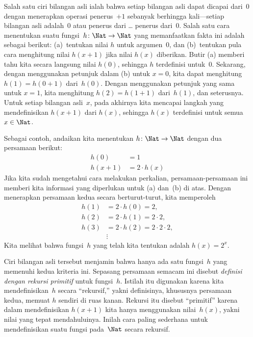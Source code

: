 \documentclass[../../../include/open-logic-section]{subfiles}
\begin{document}

Salah satu ciri bilangan asli ialah bahwa setiap bilangan asli dapat dicapai
dari~$0$ dengan menerapkan operasi penerus~$+1$ sebanyak berhingga kali---setiap
bilangan asli adalah~$0$ atau penerus dari \dots{} penerus dari~$0$. Salah satu
cara menentukan suatu fungsi~$h\colon\Nat \to \Nat$ yang memanfaatkan fakta
ini adalah sebagai berikut: (a)~tentukan nilai $h$ untuk argumen~$0$, dan
(b)~tentukan pula cara menghitung nilai $h(x+1)$ jika nilai $h(x)$ diberikan.
Butir (a) memberi tahu kita secara langsung nilai $h(0)$, sehingga $h$
terdefinisi untuk~$0$. Sekarang, dengan menggunakan petunjuk dalam (b) untuk
$x=0$, kita dapat menghitung $h(1) = h(0+1)$ dari~$h(0)$. Dengan menggunakan
petunjuk yang sama untuk $x=1$, kita menghitung $h(2) = h(1+1)$ dari~$h(1)$,
dan seterusnya. Untuk setiap bilangan asli~$x$, pada akhirnya kita mencapai
langkah yang mendefinisikan $h(x+1)$ dari $h(x)$, sehingga $h(x)$ terdefinisi
untuk semua $x \in \Nat$.

Sebagai contoh, andaikan kita menentukan $h\colon \Nat \to \Nat$ dengan dua
persamaan berikut:
\begin{align*}
h(0) & =  1\\
h(x+1) & =  2 \cdot h(x)
\end{align*}
Jika kita sudah mengetahui cara melakukan perkalian, persamaan-persamaan ini
memberi kita informasi yang diperlukan untuk (a) dan~(b) di atas. Dengan
menerapkan persamaan kedua secara berturut-turut, kita memperoleh
\begin{align*}
  h(1) & = 2\cdot h(0) = 2,\\
  h(2) & = 2\cdot h(1) = 2\cdot 2,\\
  h(3) & = 2 \cdot h(2) = 2\cdot 2 \cdot 2,\\
  & \vdots
\end{align*}
Kita melihat bahwa fungsi~$h$ yang telah kita tentukan adalah $h(x) = 2^x$.

Ciri bilangan asli tersebut menjamin bahwa hanya ada satu fungsi~$h$ yang
memenuhi kedua kriteria ini. Sepasang persamaan semacam ini disebut
\emph{definisi dengan rekursi primitif} untuk fungsi~$h$. Istilah itu digunakan
karena kita mendefinisikan~$h$ secara ``rekursif,'' yakni definisinya, khususnya
persamaan kedua, memuat $h$ sendiri di ruas kanan. Rekursi itu disebut
``primitif'' karena dalam mendefinisikan $h(x+1)$ kita hanya menggunakan
nilai~$h(x)$, yakni nilai yang tepat mendahuluinya. Inilah cara paling sederhana
untuk mendefinisikan suatu fungsi pada~$\Nat$ secara rekursif.
\end{document}
